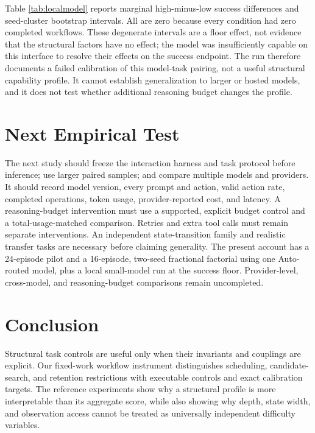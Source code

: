 \documentclass[sigconf,nonacm]{acmart}
\begin{document}
Table \ref{tab:localmodel} reports marginal high-minus-low success
differences and seed-cluster bootstrap intervals. All are zero because
every condition had zero completed workflows. These degenerate intervals
are a floor effect, not evidence that the structural factors have no
effect; the model was insufficiently capable on this interface to resolve
their effects on the success endpoint. The run therefore documents a
failed calibration of this model-task pairing, not a useful structural
capability profile. It cannot establish generalization to larger or hosted
models, and it does not test whether additional reasoning budget changes
the profile.

\begin{table}[t]
\centering\small

\caption{Exploratory local-model factorial. Each level contains 128 tasks.
Differences are paired by task seed and averaged over the other factors;
intervals resample the eight seed clusters.}
\label{tab:localmodel}
\end{table}

\section{Next Empirical Test}
The next study should freeze the interaction harness and task protocol before
inference; use larger paired samples; and compare multiple models and
providers. It should record model version, every prompt and action, valid
action rate, completed operations, token usage, provider-reported cost, and
latency. A reasoning-budget intervention must use a supported, explicit
budget control and a total-usage-matched comparison. Retries and extra tool
calls must remain separate interventions. An independent state-transition
family and realistic transfer tasks are necessary before claiming
generality. The present account has a 24-episode pilot and a 16-episode,
two-seed fractional factorial using one Auto-routed model, plus a local
small-model run at the success floor. Provider-level, cross-model, and
reasoning-budget comparisons remain uncompleted.

\section{Conclusion}
Structural task controls are useful only when their invariants and
couplings are explicit. Our fixed-work workflow instrument distinguishes
scheduling, candidate-search, and retention restrictions with executable
controls and exact calibration targets. The reference experiments show
why a structural profile is more interpretable than its aggregate score,
while also showing why depth, state width, and observation access cannot
be treated as universally independent difficulty variables.
\end{document}
